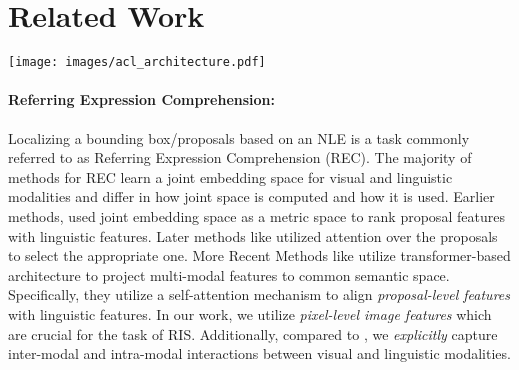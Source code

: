 \documentclass[11pt]{article}
\begin{document}
\section{Related Work}






\begin{figure*}[ht]
\begin{center}
\texttt{[image: images/acl\_architecture.pdf]}
\end{center}
\caption{}
\label{fig:arch}
\end{figure*}

\paragraph{Referring Expression Comprehension:} Localizing a bounding box/proposals based on an NLE is a task commonly referred to as Referring Expression Comprehension (REC). The majority of methods for REC learn a joint embedding space for visual and linguistic modalities and differ in how joint space is computed and how it is used. Earlier methods, \cite{hu2016natural, Rohrbach_2016, Plummer_2018_ECCV} used joint embedding space as a metric space to rank proposal features with linguistic features. Later methods like \cite{Yang2019CrossModalRI, Deng_2018_CVPR, Liu_Wan_Zhu_He_2020} utilized attention over the proposals to select the appropriate one. More Recent Methods like \cite{lu2019vilbert, 10.1007/978-3-030-58577-8_7} utilize transformer-based architecture to project multi-modal features to common semantic space. Specifically, they utilize a self-attention mechanism to align \emph{proposal-level features} with linguistic features. In our work, we utilize \emph{pixel-level image features} which are crucial for the task of RIS. Additionally, compared to  \cite{lu2019vilbert}, we \emph{explicitly} capture inter-modal and intra-modal interactions between visual and linguistic modalities. 
\end{document}
